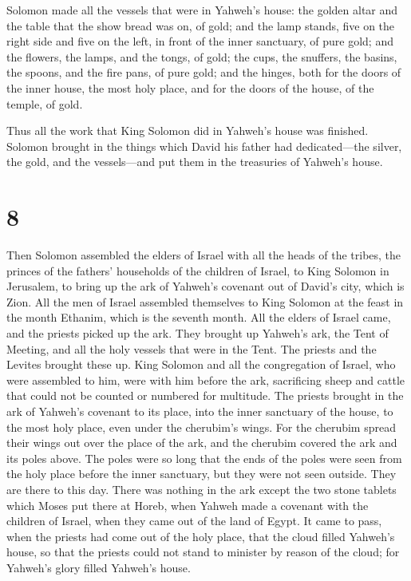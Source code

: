  Solomon made all the vessels that were in Yahweh's
house: the golden altar and the table that the show bread was on, of
gold;  and the lamp stands, five on the right side and
five on the left, in front of the inner sanctuary, of pure gold; and the
flowers, the lamps, and the tongs, of gold;  the cups,
the snuffers, the basins, the spoons, and the fire pans, of pure gold;
and the hinges, both for the doors of the inner house, the most holy
place, and for the doors of the house, of the temple, of gold.

 Thus all the work that King Solomon did in Yahweh's
house was finished. Solomon brought in the things which David his father
had dedicated---the silver, the gold, and the vessels---and put them in
the treasuries of Yahweh's house.

\hypertarget{section-7}{%
\section{8}\label{section-7}}

 Then Solomon assembled the elders of Israel with all the
heads of the tribes, the princes of the fathers' households of the
children of Israel, to King Solomon in Jerusalem, to bring up the ark of
Yahweh's covenant out of David's city, which is Zion.  All
the men of Israel assembled themselves to King Solomon at the feast in
the month Ethanim, which is the seventh month.  All the
elders of Israel came, and the priests picked up the ark. 
They brought up Yahweh's ark, the Tent of Meeting, and all the holy
vessels that were in the Tent. The priests and the Levites brought these
up.  King Solomon and all the congregation of Israel, who
were assembled to him, were with him before the ark, sacrificing sheep
and cattle that could not be counted or numbered for multitude.
 The priests brought in the ark of Yahweh's covenant to
its place, into the inner sanctuary of the house, to the most holy
place, even under the cherubim's wings.  For the cherubim
spread their wings out over the place of the ark, and the cherubim
covered the ark and its poles above.  The poles were so
long that the ends of the poles were seen from the holy place before the
inner sanctuary, but they were not seen outside. They are there to this
day.  There was nothing in the ark except the two stone
tablets which Moses put there at Horeb, when Yahweh made a covenant with
the children of Israel, when they came out of the land of Egypt.
 It came to pass, when the priests had come out of the
holy place, that the cloud filled Yahweh's house,  so
that the priests could not stand to minister by reason of the cloud; for
Yahweh's glory filled Yahweh's house.

